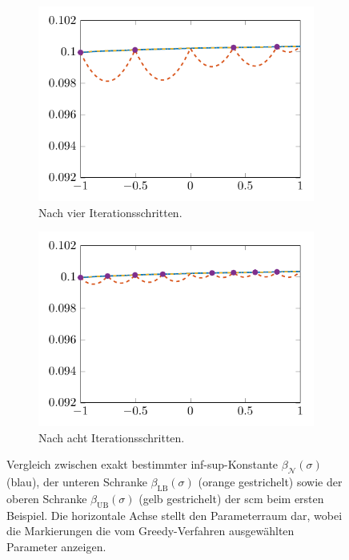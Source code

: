 \documentclass[../main.tex]{subfiles}
\begin{document}
\begin{figure}[tb]
\begin{subfigure}[b]{0.495\textwidth}
        \includegraphics[width=1\textwidth]{figures/chapter5/ch5ex1_scm_plot_4.pdf}
        \caption{Nach vier Iterationsschritten.}
    \end{subfigure}
    \begin{subfigure}[b]{0.495\textwidth}
        \centering
        \includegraphics[width=1\textwidth]{figures/chapter5/ch5ex1_scm_plot_8.pdf}
        \caption{Nach acht Iterationsschritten.}
    \end{subfigure}
    \caption[Vergleich der SCM-Schranke über mehrere Iterationsschritte, erstes Beispiel.]{%
        Vergleich zwischen exakt bestimmter inf-sup-Konstante $\beta_{\mathcal N}(\sigma)$ (blau), der unteren Schranke $\beta_{\mathrm{LB}}(\sigma)$ (orange gestrichelt) sowie der oberen Schranke $\beta_{\mathrm{UB}}(\sigma)$ (gelb gestrichelt) der \ac{scm} beim ersten Beispiel.
        Die horizontale Achse stellt den Parameterraum dar, wobei die Markierungen die vom Greedy-Verfahren ausgewählten Parameter anzeigen.
    }
    \label{figure:vergleich_scm_iterationen}
\end{figure}
\end{document}
